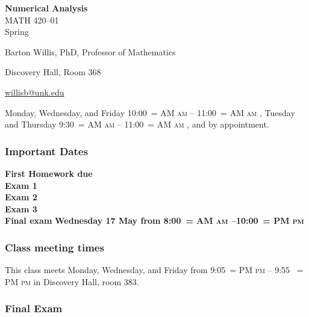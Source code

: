 \documentclass[12pt,fullpage]{article}
\makeatletter
\newcounter{ex}\setcounter{ex}{0}
\newenvironment{mypar}[2]
  {\begin{list}{}%
    {\setlength\leftmargin{#1}
    \setlength\rightmargin{#2}}
    \item[]}
  {\end{list}}
\renewenvironment{description}[0]{\begin{compactdesc}}{\end{compactdesc}}
\DeclareRobustCommand{\maybefakesc}[1]{%
  \ifnum\pdfstrcmp{\f@series}{\bfdefault}=\z@
    {\fontsize{\dimexpr0.8\dimexpr\f@size pt\relax}{0}\selectfont\uppercase{#1}}%
  \else
    \textsc{#1}%
  \fi
}
\newcommand\AM{\,\maybefakesc{am}\xspace}
\newcommand\PM{\,\maybefakesc{pm}\xspace}
\newcommand{\coursename}{Numerical Analysis}
\newcommand{\coursenumber}{MATH 420}
\newcommand{\sectionnumber}{01}
\newcommand{\term}{Spring }
\newcommand{\room}{Discovery Hall, room  383}
\newcommand{\meetingtime}{This class meets Monday, Wednesday, and Friday  from 
	9:05\PM{}  --  9:55 \PM}
\newcommand{\finaldateandtime}{Wednesday 17 May \the\year{} from 8:00\AM{}--10:00\PM}
\newcommand{\officehours}{ Monday, Wednesday, and Friday 10:00\AM{} -- 11:00\AM,
    Tuesday and Thursday 9:30\AM -- 11:00\AM, and by appointment.}
\makeatother
\begin{document}
\cleanlookdateon%
\shortdate
\printyearoff
\large
\begin{center}
    \textbf{\coursename}  \\
    {\coursenumber--\sectionnumber} \\
     {\term \the\year} \\
\end{center}

\vskip0.25in
\normalsize

\begin{center}
    \begin{description}
        \item[Instructor:] Barton Willis, PhD, Professor of Mathematics
        \item[Office:]  Discovery Hall, Room 368
        \item[\phone:]   
        \item[\Email:]    \href{mailto:willisb@unk.edu}{willisb@unk.edu}
        \item[Office Hours:] \officehours
      \end{description}
    \end{center}

    \subsubsection*{Important Dates}

\begin{mypar}{0.25in}{0.25in} 

      \textbf{First Homework due} \dotfill  \textbf{}  \\
       \textbf{Exam 1} \dotfill \textbf{}  \\
    \textbf{Exam 2} \dotfill  \textbf{} \\
    \textbf{Exam 3} \dotfill \textbf{} \\
         \textbf{Final exam} \dotfill  \textbf{\finaldateandtime}
\end{mypar}
    \subsubsection*{Class meeting times}

\meetingtime{} in \room.

\subsubsection*{Final Exam}
\end{document}
